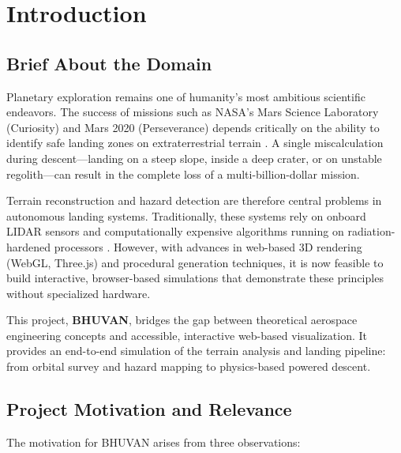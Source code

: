 \chapter{Introduction}

\section{Brief About the Domain}
Planetary exploration remains one of humanity's most ambitious scientific endeavors. The success of missions such as NASA's Mars Science Laboratory (Curiosity) and Mars 2020 (Perseverance) depends critically on the ability to identify safe landing zones on extraterrestrial terrain \cite{golombek2012msl}. A single miscalculation during descent---landing on a steep slope, inside a deep crater, or on unstable regolith---can result in the complete loss of a multi-billion-dollar mission.

Terrain reconstruction and hazard detection are therefore central problems in autonomous landing systems. Traditionally, these systems rely on onboard LIDAR sensors and computationally expensive algorithms running on radiation-hardened processors \cite{johnson2007terrain}. However, with advances in web-based 3D rendering (WebGL, Three.js) and procedural generation techniques, it is now feasible to build interactive, browser-based simulations that demonstrate these principles without specialized hardware.

This project, \textbf{BHUVAN}, bridges the gap between theoretical aerospace engineering concepts and accessible, interactive web-based visualization. It provides an end-to-end simulation of the terrain analysis and landing pipeline: from orbital survey and hazard mapping to physics-based powered descent.

\section{Project Motivation and Relevance}
The motivation for BHUVAN arises from three observations:

